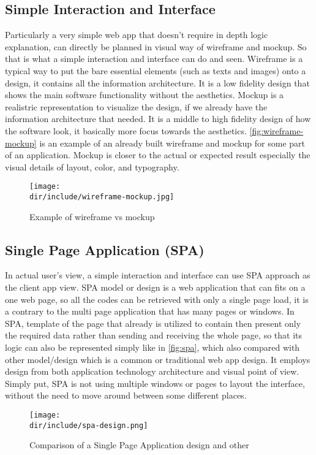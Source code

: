 \subsection{Simple Interaction and Interface}
\label{ssec:simple-interfaction}

Particularly a very simple web app that doesn't require in depth logic explanation, can directly be planned in visual way of wireframe and mockup.
So that is what a simple interaction and interface can do and seen.
Wireframe is a typical way to put the bare essential elements (such as texts and images) onto a design, it contains all the information architecture.
It is a low fidelity design that shows the main software functionality without the aesthetics.
Mockup is a realistric representation to visualize the design, if we already have the information architecture that needed.
It is a middle to high fidelity design of how the software look, it basically more focus towards the aesthetics.
\autoref{fig:wireframe-mockup} is an example of an already built wireframe and mockup for some part of an application.
Mockup is closer to the actual or expected result especially the visual details of layout, color, and typography.

\begin{figure}[htbp]
  \centering
  \texttt{[image: \\dir/include/wireframe-mockup.jpg]}
  \caption[Wireframe vs Mockup Example]{Example of wireframe vs mockup \autocite{Trentini2015WM}}
  \label{fig:wireframe-mockup}
\end{figure}

\subsection{Single Page Application (SPA)}
\label{ssec:spa}

In actual user's view, a simple interaction and interface can use \ac{SPA} approach as the client app view.
\ac{SPA} model or design is a web application that can fits on a one web page, so all the codes can be retrieved with only a single page load, it is a contrary to the multi page application that has many pages or windows.
In \ac{SPA}, template of the page that already is utilized to contain then present only the required data rather than sending and receiving the whole page, so that its logic can also be represented simply like in \autoref{fig:spa}, which also compared with other model/design which is a common or traditional web app design.
It employs design from both application technology architecture and visual point of view.
Simply put, \ac{SPA} is not using multiple windows or pages to layout the interface, without the need to move around between some different places.

\begin{figure}[htbp]
  \centering
  \texttt{[image: \\dir/include/spa-design.png]}
  \caption[Single Page Application design comparison]{Comparison of a Single Page Application design and other}
  \label{fig:spa}
\end{figure}
